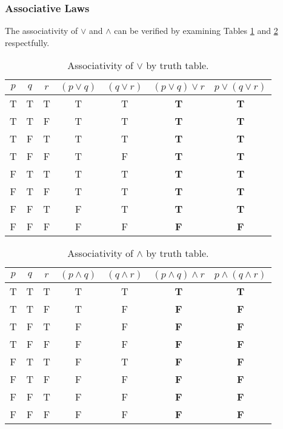\documentclass[twocolumn]{report}
\begin{document}
\subsubsection{Associative Laws}
The associativity of $\lor$ and $\wedge$ can be verified by examining Tables \ref{tab: disjunction-associativity-truth-table} and \ref{tab: conjunction-associativity-truth-table} respectfully.
\begin{table}[h]
	\centering
	\begin{tabular}{ccc|c|c|c|c}
		$p$ & $q$ & $r$ & $(p\lor q)$ & $(q \lor r)$ & $(p \lor q) \lor r$ & $p \lor (q \lor r)$ \\ \hline
		T & T & T & T & T & \textbf{T} & \textbf{T}  \\
		T & T & F & T & T & \textbf{T} & \textbf{T}  \\
		T & F & T & T & T & \textbf{T} & \textbf{T}  \\
		T & F & F & T & F & \textbf{T} & \textbf{T}  \\
		F & T & T & T & T & \textbf{T} & \textbf{T}  \\
		F & T & F & T & T & \textbf{T} & \textbf{T}  \\
		F & F & T & F & T & \textbf{T} & \textbf{T}  \\
		F & F & F & F & F & \textbf{F} & \textbf{F}  \\
	\end{tabular}
	\caption{Associativity of $\lor$ by truth table.}
	\label{tab: disjunction-associativity-truth-table}
\end{table}
\begin{table}[h]
	\centering
	\begin{tabular}{ccc|c|c|c|c}
		$p$ & $q$ & $r$ & $(p\wedge q)$ & $(q \wedge r)$ & $(p \wedge q) \wedge r$ & $p \wedge (q \wedge r)$ \\ \hline
		T & T & T & T & T & \textbf{T} & \textbf{T}  \\
		T & T & F & T & F & \textbf{F} & \textbf{F}  \\
		T & F & T & F & F & \textbf{F} & \textbf{F}  \\
		T & F & F & F & F & \textbf{F} & \textbf{F}  \\
		F & T & T & F & T & \textbf{F} & \textbf{F}  \\
		F & T & F & F & F & \textbf{F} & \textbf{F}  \\
		F & F & T & F & F & \textbf{F} & \textbf{F}  \\
		F & F & F & F & F & \textbf{F} & \textbf{F}  \\
	\end{tabular}
	\caption{Associativity of $\wedge$ by truth table.}
	\label{tab: conjunction-associativity-truth-table}
\end{table}
\end{document}
